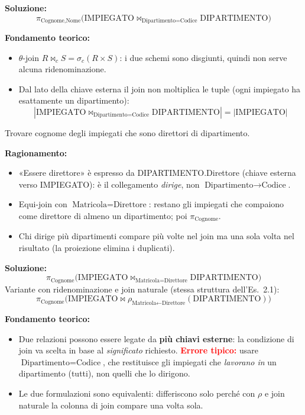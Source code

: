 \documentclass[12pt, a4paper]{article}
\begin{document}
\textbf{Soluzione:}
$$\pi_{\text{Cognome},\text{Nome}}\big(\text{IMPIEGATO}\bowtie_{\text{Dipartimento}=\text{Codice}}\text{DIPARTIMENTO}\big)$$

\textbf{Fondamento teorico:}
\begin{itemize}
\item $\theta$-join $R\bowtie_c S=\sigma_c(R\times S)$: i due schemi sono disgiunti, quindi non serve alcuna ridenominazione.
\item Dal lato della chiave esterna il join non moltiplica le tuple (ogni impiegato ha esattamente un dipartimento):
$$|\text{IMPIEGATO}\bowtie_{\text{Dipartimento}=\text{Codice}}\text{DIPARTIMENTO}|=|\text{IMPIEGATO}|$$
\end{itemize}

\begin{tcolorbox}[colback=lightergray!10, colframe=tocsec, title=\textbf{Esercizio 1.4}]
Trovare cognome degli impiegati che sono direttori di dipartimento.
\end{tcolorbox}

\textbf{Ragionamento:}
\begin{itemize}
\item «Essere direttore» è espresso da DIPARTIMENTO.Direttore (chiave esterna verso IMPIEGATO): è il collegamento \emph{dirige}, non $\text{Dipartimento}\to\text{Codice}$.
\item Equi-join con $\text{Matricola}=\text{Direttore}$: restano gli impiegati che compaiono come direttore di almeno un dipartimento; poi $\pi_{\text{Cognome}}$.
\item Chi dirige più dipartimenti compare più volte nel join ma una sola volta nel risultato (la proiezione elimina i duplicati).
\end{itemize}

\textbf{Soluzione:}
$$\pi_{\text{Cognome}}\big(\text{IMPIEGATO}\bowtie_{\text{Matricola}=\text{Direttore}}\text{DIPARTIMENTO}\big)$$
Variante con ridenominazione e join naturale (stessa struttura dell'Es.~2.1):
$$\pi_{\text{Cognome}}\big(\text{IMPIEGATO}\bowtie\rho_{\text{Matricola}\leftarrow\text{Direttore}}(\text{DIPARTIMENTO})\big)$$

\textbf{Fondamento teorico:}
\begin{itemize}
\item Due relazioni possono essere legate da \textbf{più chiavi esterne}: la condizione di join va scelta in base al \emph{significato} richiesto. \textcolor{red}{\textbf{Errore tipico:}} usare $\text{Dipartimento}=\text{Codice}$, che restituisce gli impiegati che \emph{lavorano in} un dipartimento (tutti), non quelli che lo dirigono.
\item Le due formulazioni sono equivalenti: differiscono solo perché con $\rho$ e join naturale la colonna di join compare una volta sola.
\end{itemize}
\end{document}
